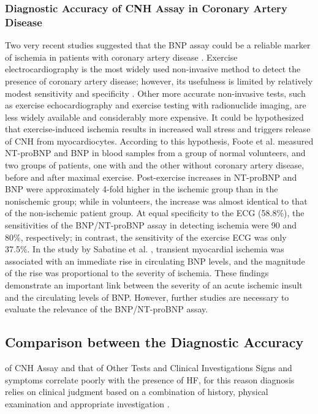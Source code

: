 \documentclass[14pt,a4paper,onecolumn]{extarticle}
\begin{document}
\subsubsection{ Diagnostic Accuracy of CNH Assay in Coronary Artery Disease}

Two very recent studies suggested that the BNP assay could be a reliable marker of
ischemia in patients with coronary artery disease \citep{bib3163} \citep{bib3164}. Exercise electrocardiography
is the most widely used non-invasive method to detect the presence of coronary artery
disease; however, its usefulness is limited by relatively modest sensitivity and specificity \citep{bib3165} \citep{bib3166} \citep{bib3167}. Other more accurate non-invasive tests, such as exercise echocardiography and exercise testing with radionuclide imaging, are less widely available and considerably more expensive.
It could be hypothesized that exercise-induced ischemia results in increased wall
stress and triggers release of CNH from myocardiocytes. According to this hypothesis,
Foote et al. \citep{bib3163} measured NT-proBNP and BNP in blood samples from a group of
normal volunteers, and two groups of patients, one with and the other without coronary
artery disease, before and after maximal exercise. Post-exercise increases in NT-proBNP and BNP were approximately 4-fold higher in the ischemic group than in the nonischemic group; while in volunteers, the increase was almost identical to that of the
non-ischemic patient group. At equal specificity to the ECG (58.8\%), the sensitivities
of the BNP/NT-proBNP assay in detecting ischemia were 90 and 80\%, respectively; in
contrast, the sensitivity of the exercise ECG was only 37.5\%.
In the study by Sabatine et al. \citep{bib3164}, transient myocardial ischemia was associated with
an immediate rise in circulating BNP levels, and the magnitude of the rise was proportional
to the severity of ischemia. These findings demonstrate an important link between the
severity of an acute ischemic insult and the circulating levels of BNP. However, further
studies are necessary to evaluate the relevance of the BNP/NT-proBNP assay.

\subsection{ Comparison between the Diagnostic Accuracy}

of CNH Assay and that of Other Tests and Clinical Investigations
Signs and symptoms correlate poorly with the presence of HF, for this reason diagnosis relies on clinical judgment based on a combination of history, physical examination
and appropriate investigation \citep{bib365} \citep{bib369} \citep{bib370} \citep{bib3168}.
\end{document}
